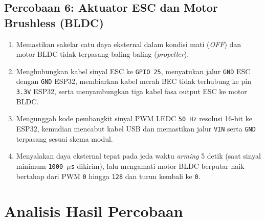 \subsection{Percobaan 6: Aktuator ESC dan Motor Brushless (BLDC)}
\begin{enumerate}
    \item Memastikan sakelar catu daya eksternal dalam kondisi mati (\textit{OFF}) dan motor BLDC tidak terpasang baling-baling (\textit{propeller}).
    \item Menghubungkan kabel sinyal ESC ke \texttt{GPIO 25}, menyatukan jalur \texttt{GND} ESC dengan \texttt{GND} ESP32, membiarkan kabel merah BEC tidak terhubung ke pin \texttt{3.3V} ESP32, serta menyambungkan tiga kabel fasa output ESC ke motor BLDC.
    \item Mengunggah kode pembangkit sinyal PWM LEDC \texttt{50 Hz} resolusi 16-bit ke ESP32, kemudian mencabut kabel USB dan memastikan jalur \texttt{VIN} serta \texttt{GND} terpasang sesuai skema modul.
    \item Menyalakan daya eksternal tepat pada jeda waktu \textit{arming} 5 detik (saat sinyal minimum \texttt{1000 $\mu$s} dikirim), lalu mengamati motor BLDC berputar naik bertahap dari PWM \texttt{0} hingga \texttt{128} dan turun kembali ke \texttt{0}.
\end{enumerate}

\section{Analisis Hasil Percobaan}

